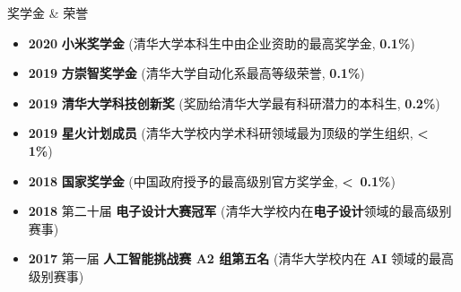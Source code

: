 \documentclass{resume} %
\begin{document}
\begin{rSection}{奖学金 \& 荣誉}

\begin{itemize}
    \item \textbf{2020 } \textbf{小米奖学金 } (清华大学本科生中由企业资助的最高奖学金, \textbf{0.1\%})
    \item \textbf{2019 } \textbf{方崇智奖学金 } (清华大学自动化系最高等级荣誉, \textbf{0.1\%})
    \item \textbf{2019 } \textbf{清华大学科技创新奖 } (奖励给清华大学最有科研潜力的本科生, \textbf{0.2\%})
    \item \textbf{2019 } \textbf{星火计划成员 } (清华大学校内学术科研领域最为顶级的学生组织, \textbf{\textless \, 1\%})
    \item \textbf{2018 } \textbf{国家奖学金 } (中国政府授予的最高级别官方奖学金, \textbf{\textless \, 0.1\%})
    \item \textbf{2018 } 第二十届 \textbf{电子设计大赛冠军 } (清华大学校内在\textbf{电子设计}领域的最高级别赛事)
    \item \textbf{2017 } 第一届 \textbf{人工智能挑战赛 A2 组第五名 } (清华大学校内在 \textbf{AI} 领域的最高级别赛事)\newline
\end{itemize}

\end{rSection}
\end{document}
